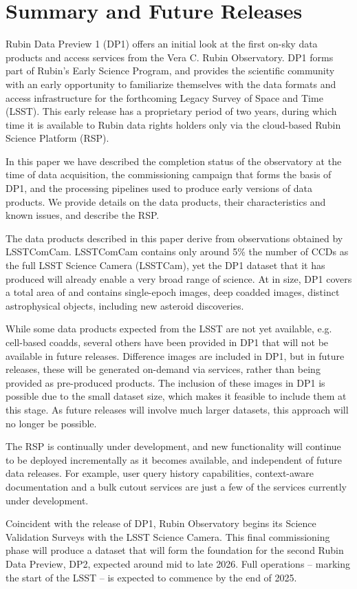 \section{Summary and Future Releases
\label{sec:summary}}

Rubin Data Preview 1 (DP1) offers an initial look at the first on-sky data products and access services from the Vera C. Rubin Observatory. DP1 forms part of Rubin's Early Science Program, and provides the scientific community with an early opportunity to familiarize themselves with the data formats and access infrastructure for the forthcoming Legacy Survey of Space and Time (LSST).
This early release has a proprietary period of two years, during which time it is  available to Rubin data rights holders only via the cloud-based Rubin Science Platform (RSP). 

In this paper we have described the completion status of the observatory at the time of data acquisition, the commissioning campaign that forms the basis of DP1, and the processing pipelines used to produce early versions of data products.
We provide details on the data products, their characteristics and 
known issues, and describe the RSP. 

The data products described in this paper derive from observations obtained by LSSTComCam. LSSTComCam contains only around 5\% the number of CCDs as the full LSST Science Camera (LSSTCam), yet the DP1 dataset that it has produced will already enable a very broad range of science. 
At \sizeinbytes in size, DP1 covers a total area of \totalarea and contains \nexposures single-epoch images, \ndeepcoadds deep coadded images, \nobjects distinct astrophysical objects, including  \nnewasteroiddiscoveries  new asteroid discoveries. 

While some data products expected from the LSST are not yet available, e.g. cell-based coadds, several others have been provided in DP1 that will not be available in future releases.
Difference images are included in DP1, but in future releases, these will be generated on-demand via services, rather than being provided as pre-produced products. 
The inclusion of these images in DP1 is possible due to the small dataset size, which makes it feasible to include them at this stage. 
As future releases will involve much larger datasets, this approach will no longer be possible.

The RSP is continually under development, and new functionality will continue to be deployed incrementally as it becomes available, and independent of future data releases. 
For example, user query history capabilities, context-aware documentation and a bulk cutout services are just a few of the services currently under development. 

Coincident with the release of DP1, Rubin Observatory begins its Science Validation Surveys with the LSST Science Camera. 
This final commissioning phase will produce a dataset that will form the foundation for the second Rubin Data Preview, DP2, expected around mid to late 2026.
Full operations -- marking the start of the LSST -- is expected to commence by the end of 2025.